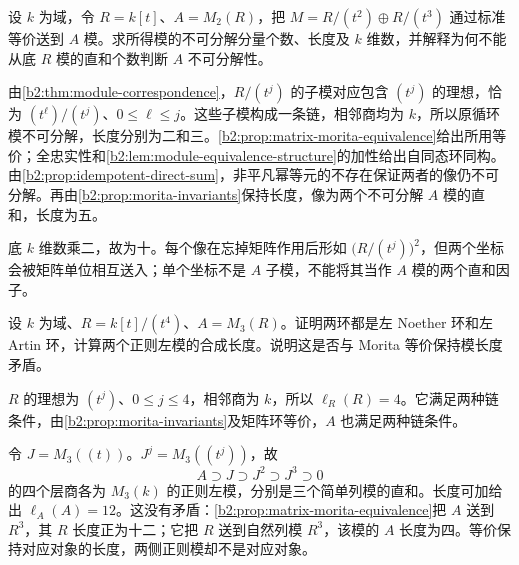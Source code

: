 \begin{exercise}\label{b2:ex:16-indecomposable-transport}
	设 \(k\) 为域，令 \(R=k[t]\)、\(A=M_2(R)\)，把 \(M=R/(t^2)\oplus R/(t^3)\) 通过标准等价送到 \(A\) 模。求所得模的不可分解分量个数、长度及 \(k\) 维数，并解释为何不能从底 \(R\) 模的直和个数判断 \(A\) 不可分解性。
\end{exercise}
\begin{solution}
	由\cref{b2:thm:module-correspondence}，\(R/(t^j)\) 的子模对应包含 \((t^j)\) 的理想，恰为 \((t^\ell)/(t^j)\)、\(0\le\ell\le j\)。这些子模构成一条链，相邻商均为 \(k\)，所以原循环模不可分解，长度分别为二和三。\cref{b2:prop:matrix-morita-equivalence}给出所用等价；全忠实性和\cref{b2:lem:module-equivalence-structure}的加性给出自同态环同构。由\cref{b2:prop:idempotent-direct-sum}，非平凡幂等元的不存在保证两者的像仍不可分解。再由\cref{b2:prop:morita-invariants}保持长度，像为两个不可分解 \(A\) 模的直和，长度为五。

	底 \(k\) 维数乘二，故为十。每个像在忘掉矩阵作用后形如 \(\bigl(R/(t^j)\bigr)^2\)，但两个坐标会被矩阵单位相互送入；单个坐标不是 \(A\) 子模，不能将其当作 \(A\) 模的两个直和因子。
\end{solution}

\begin{exercise}\label{b2:ex:16-ring-chain-invariants}
	设 \(k\) 为域、\(R=k[t]/(t^4)\)、\(A=M_3(R)\)。证明两环都是左 Noether 环和左 Artin 环，计算两个正则左模的合成长度。说明这是否与 Morita 等价保持模长度矛盾。
\end{exercise}
\begin{solution}
	\(R\) 的理想为 \((t^j)\)、\(0\le j\le4\)，相邻商为 \(k\)，所以 \(\ell_R(R)=4\)。它满足两种链条件，由\cref{b2:prop:morita-invariants}及矩阵环等价，\(A\) 也满足两种链条件。

	令 \(J=M_3((t))\)。\(J^j=M_3((t^j))\)，故
	\[
		A\supset J\supset J^2\supset J^3\supset0
	\]
	的四个层商各为 \(M_3(k)\) 的正则左模，分别是三个简单列模的直和。长度可加给出 \(\ell_A(A)=12\)。这没有矛盾：\cref{b2:prop:matrix-morita-equivalence}把 \(A\) 送到 \(R^3\)，其 \(R\) 长度正为十二；它把 \(R\) 送到自然列模 \(R^3\)，该模的 \(A\) 长度为四。等价保持对应对象的长度，两侧正则模却不是对应对象。
\end{solution}

